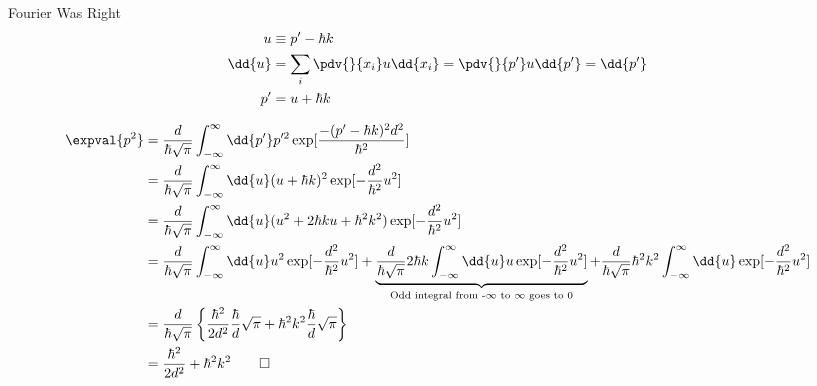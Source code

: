 \begin{answer}
\begin{answerpart}{Fourier Was Right}
    \begin{equation}
      \begin{split}
        u &\equiv p' - \hbar k\\
        \dd{u} &= \sum_i \pdv{}{x_i}u \dd{x_i} = \pdv{}{p'}u \dd{p'} = \dd{p'}\\
        p' &= u + \hbar k\\
      \end{split}
    \end{equation}

    \begin{equation}
      \begin{split}
        \expval{p^2}
        &=
        \frac{d}{\hbar\sqrt{\pi}}
        \int_{-\infty}^{\infty} \dd{p'} p'^2
        \exp[\frac{-(p' - \hbar k)^2d^2}{\hbar^2}]
        \\
        &=
        \frac{d}{\hbar\sqrt{\pi}}
        \int_{-\infty}^{\infty} \dd{u} (u + \hbar k)^2
        \exp[-\frac{d^2}{\hbar^2}u^2]
        \\
        &=
        \frac{d}{\hbar\sqrt{\pi}}
        \int_{-\infty}^{\infty} \dd{u} (u^2 + 2\hbar k u + \hbar^2 k^2)
        \exp[-\frac{d^2}{\hbar^2}u^2]
        \\
        &=
        \frac{d}{\hbar\sqrt{\pi}}
        \int_{-\infty}^{\infty} \dd{u} u^2
        \exp[-\frac{d^2}{\hbar^2}u^2]
        +
        \underbrace{
        \frac{d}{\hbar\sqrt{\pi}}
        2\hbar k
        \int_{-\infty}^{\infty} \dd{u} u
        \exp[-\frac{d^2}{\hbar^2}u^2]
        }_{\text{Odd integral from -$\infty$ to $\infty$ goes to 0}}
        +
        \frac{d}{\hbar\sqrt{\pi}}
        \hbar^2 k^2
        \int_{-\infty}^{\infty} \dd{u}
        \exp[-\frac{d^2}{\hbar^2}u^2]
        \\
        &=
        \frac{d}{\hbar\sqrt{\pi}}
        \left\{
        \frac{\hbar^2}{2d^2}
        \frac{\hbar}{d}\sqrt{\pi}
        +
        \hbar^2 k^2
        \frac{\hbar}{d}\sqrt{\pi}
        \right\}
        \\
        &=
        \frac{\hbar^2}{2d^2}
        +
        \hbar^2 k^2\qed
        \\
      \end{split}
    \end{equation}
    

  \end{answerpart}

\end{answer}
